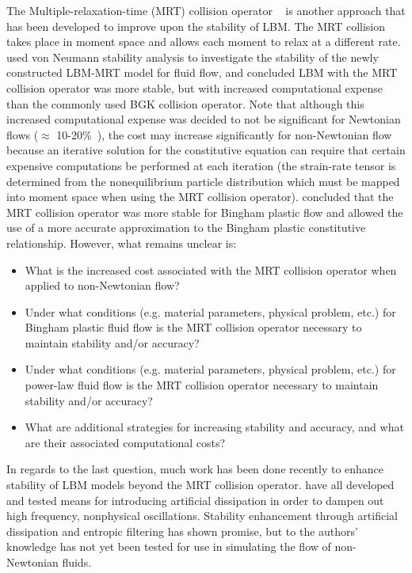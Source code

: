 The Multiple-relaxation-time (MRT) collision operator ~\cite{d1994generalized} is another approach that has been developed to improve upon the stability of LBM.
The MRT collision takes place in moment space and allows each moment to relax at a different rate.
\cite{lallemand2000theory} used von Neumann stability analysis to investigate the stability of the newly constructed LBM-MRT model for fluid flow, and concluded LBM with the MRT collision operator was more stable, but with increased computational expense than the commonly used BGK collision operator.
Note that although this increased computational expense was decided to not be significant for Newtonian flows ($\approx$ 10-20\%~\cite{lallemand2000theory}), the cost may increase significantly for non-Newtonian flow because an iterative solution for the constitutive equation can require that certain expensive computations be performed at each iteration (the strain-rate tensor is determined from the nonequilibrium particle distribution which must be mapped into moment space when using the MRT collision operator).
\cite{chen2014simulations} concluded that the MRT collision operator was more stable for Bingham plastic flow and allowed the use of a more accurate approximation to the Bingham plastic constitutive relationship.
However, what remains unclear is:
\begin{itemize}
    \item What is the increased cost associated with the MRT collision operator when applied to non-Newtonian flow?
    \item Under what conditions (e.g. material parameters, physical problem, etc.) for Bingham plastic fluid flow is the MRT collision operator necessary to maintain stability and/or accuracy?
    \item Under what conditions (e.g. material parameters, physical problem, etc.) for power-law fluid flow is the MRT collision operator necessary to maintain stability and/or accuracy?
    \item What are additional strategies for increasing stability and accuracy, and what are their associated computational costs?
\end{itemize}
In regards to the last question, much work has been done recently to enhance stability of LBM models beyond the MRT collision operator.
\cite{brownlee2006stabilization,brownlee2007stability,brownlee2008nonequilibrium,packwood2009entropy,gorban2014enhancement} have all developed and tested means for introducing artificial dissipation in order to dampen out high frequency, nonphysical oscillations.
Stability enhancement through artificial dissipation and entropic filtering has shown promise, but to the authors' knowledge has not yet been tested for use in simulating the flow of non-Newtonian fluids.

